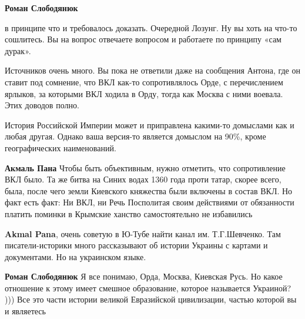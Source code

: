 \begin{itemize}
\begin{itemize}
 
\textbf{Роман Слободянюк} 

в принципе что и требовалось доказать. Очередной Лозунг. Ну вы хоть на что-то
сошлитесь. Вы на вопрос отвечаете вопросом и работаете по принципу «сам дурак».

Источников очень много. Вы пока не ответили даже на сообщения Антона, где он
ставит под сомнение, что ВКЛ как-то сопротивлялось Орде, с перечислением
ярлыков, за которыми ВКЛ ходила в Орду, тогда как Москва с ними воевала. Этих
доводов полно.

История Российской Империи может и приправлена какими-то домыслами как и любая
другая. Однако ваша версия-то является домыслом на 90\%, кроме географических
наименований.

 
\textbf{Акмаль Пана} Чтобы быть объективным, нужно отметить, что сопротивление ВКЛ было. Та же битва на Синих водах 1360 года проти татар, скорее всего, была, после чего земли Киевского княжества были включены в состав ВКЛ. Но факт есть факт: Ни ВКЛ, ни Речь Посполитая своим действиями от обязанности платить поминки в Крымские ханство самостоятельно не избавились

 
\textbf{Akmal Pana}, очень советую в Ю-Тубе найти канал им. Т.Г.Шевченко. Там писатели-историки много рассказывают об истории Украины с картами и документами. Но на украинском языке.

 
\textbf{Роман Слободянюк} Я все понимаю, Орда, Москва, Киевская Русь. Но какое отношение к этому имеет смешное образование, которое называется Украиной? ))) Все это части истории великой Евразийской цивилизации, частью которой вы и являетесь


\end{itemize}
\end{itemize}
